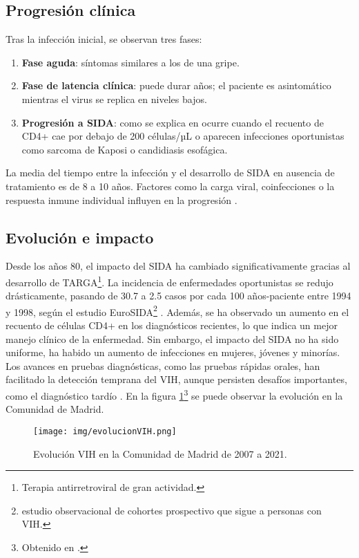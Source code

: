 \subsection{Progresión clínica}
Tras la infección inicial, se observan tres fases:
\begin{enumerate}
    \item \textbf{Fase aguda}: síntomas similares a los de una gripe.
    \item \textbf{Fase de latencia clínica}: puede durar años; el paciente es asintomático mientras el virus se replica en niveles bajos.
    \item \textbf{Progresión a SIDA}: como se explica en \cite{okoye2013cd} ocurre cuando el recuento de CD4+ cae por debajo de 200 células/µL o aparecen infecciones oportunistas como sarcoma de Kaposi o candidiasis esofágica.
\end{enumerate}
La media del tiempo entre la infección y el desarrollo de SIDA en ausencia de tratamiento es de 8 a 10 años. Factores como la carga viral, coinfecciones o la respuesta inmune individual influyen en la progresión \cite{hoover1992progression}.

\subsection{Evolución e impacto}
Desde los años 80, el impacto del SIDA ha cambiado significativamente gracias al desarrollo de TARGA\footnote{Terapia antirretroviral de gran actividad.}. La incidencia de enfermedades oportunistas se redujo drásticamente, pasando de 30.7 a 2.5 casos por cada 100 años-paciente entre 1994 y 1998, según el estudio EuroSIDA\footnote{estudio observacional de cohortes prospectivo que sigue a personas con VIH.} \cite{mocroft2000aids}. Además, se ha observado un aumento en el recuento de células CD4+ en los diagnósticos recientes, lo que indica un mejor manejo clínico de la enfermedad. Sin embargo, el impacto del SIDA no ha sido uniforme, ha habido un aumento de infecciones en mujeres, jóvenes y minorías. Los avances en pruebas diagnósticas, como las pruebas rápidas orales, han facilitado la detección temprana del VIH, aunque persisten desafíos importantes, como el diagnóstico tardío \cite{san2003incidence}.
En la figura \ref{fig:evolución vih}\footnote{Obtenido en \cite{madrid_salud_poblacion}.} se puede observar la evolución en la Comunidad de Madrid. 

\begin{figure}[H]
    \centering
    \texttt{[image: img/evolucionVIH.png]}
    \caption{Evolución VIH en la Comunidad de Madrid de 2007 a 2021.}
    \label{fig:evolución vih}
    \vspace{0.5cm} %
\end{figure}

